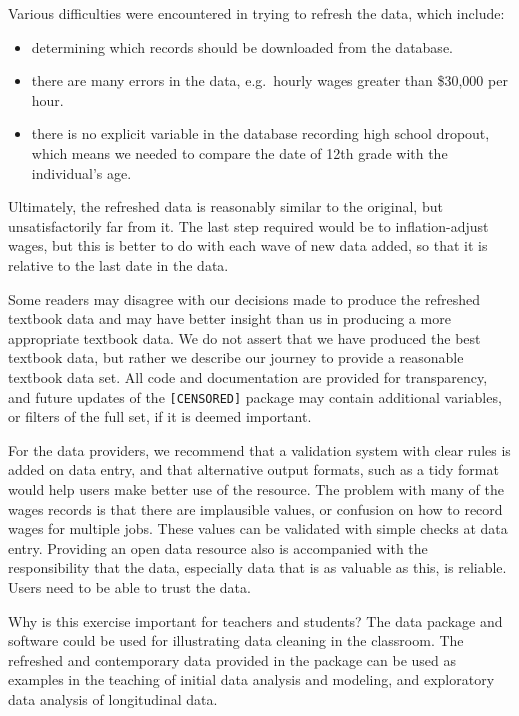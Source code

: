 \documentclass{article}
\begin{document}
Various difficulties were encountered in trying to refresh the data, which include:

\begin{itemize}
\tightlist
\item
  determining which records should be downloaded from the database.
\item
  there are many errors in the data, e.g.~hourly wages greater than \$30,000 per hour.
\item
  there is no explicit variable in the database recording high school dropout, which means we needed to compare the date of 12th grade with the individual's age.
\end{itemize}

Ultimately, the refreshed data is reasonably similar to the original, but unsatisfactorily far from it. The last step required would be to inflation-adjust wages, but this is better to do with each wave of new data added, so that it is relative to the last date in the data.

Some readers may disagree with our decisions made to produce the refreshed textbook data and may have better insight than us in producing a more appropriate textbook data. We do not assert that we have produced the best textbook data, but rather we describe our journey to provide a reasonable textbook data set. All code and documentation are provided for transparency, and future updates of the \texttt{[CENSORED]} package may contain additional variables, or filters of the full set, if it is deemed important.

For the data providers, we recommend that a validation system with clear rules is added on data entry, and that alternative output formats, such as a tidy format would help users make better use of the resource. The problem with many of the wages records is that there are implausible values, or confusion on how to record wages for multiple jobs. These values can be validated with simple checks at data entry. Providing an open data resource also is accompanied with the responsibility that the data, especially data that is as valuable as this, is reliable. Users need to be able to trust the data.

Why is this exercise important for teachers and students? The data package and software could be used for illustrating data cleaning in the classroom. The refreshed and contemporary data provided in the package can be used as examples in the teaching of initial data analysis and modeling, and exploratory data analysis of longitudinal data.
\end{document}
